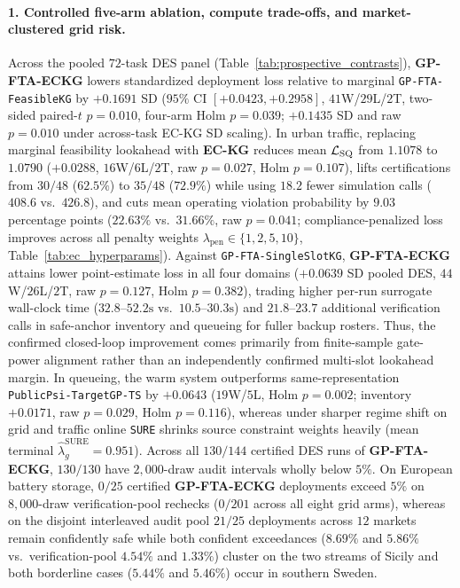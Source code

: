 \paragraph{1. Controlled five-arm ablation, compute trade-offs, and market-clustered grid risk.}
Across the pooled $72$-task DES panel (Table~\ref{tab:prospective_contrasts}), \textbf{GP-FTA-ECKG} lowers standardized deployment loss relative to marginal \texttt{GP-FTA-FeasibleKG} by $+0.1691$ SD ($95\%$ CI $[+0.0423, +0.2958]$, $41$W/$29$L/$2$T, two-sided paired-$t$ $p = 0.010$, four-arm Holm $p = 0.039$; $+0.1435$ SD and raw $p = 0.010$ under across-task EC-KG SD scaling). In urban traffic, replacing marginal feasibility lookahead with \textbf{EC-KG} reduces mean $\mathcal{L}_{\mathrm{SQ}}$ from $1.1078$ to $1.0790$ ($+0.0288$, $16$W/$6$L/$2$T, raw $p = 0.027$, Holm $p = 0.107$), lifts certifications from $30/48$ ($62.5\%$) to $35/48$ ($72.9\%$) while using $18.2$ fewer simulation calls ($408.6$ vs.\ $426.8$), and cuts mean operating violation probability by $9.03$ percentage points ($22.63\%$ vs.\ $31.66\%$, raw $p = 0.041$; compliance-penalized loss improves across all penalty weights $\lambda_{\mathrm{pen}}\in\{1,2,5,10\}$, Table~\ref*{tab:ec_hyperparams}). Against \texttt{GP-FTA-SingleSlotKG}, \textbf{GP-FTA-ECKG} attains lower point-estimate loss in all four domains ($+0.0639$ SD pooled DES, $44$W/$26$L/$2$T, raw $p=0.127$, Holm $p=0.382$), trading higher per-run surrogate wall-clock time ($32.8$--$52.2\text{s}$ vs.\ $10.5$--$30.3\text{s}$) and $21.8$--$23.7$ additional verification calls in safe-anchor inventory and queueing for fuller backup rosters. Thus, the confirmed closed-loop improvement comes primarily from finite-sample gate-power alignment rather than an independently confirmed multi-slot lookahead margin. In queueing, the warm system outperforms same-representation \texttt{PublicPsi-TargetGP-TS} by $+0.0643$ ($19$W/$5$L, Holm $p=0.002$; inventory $+0.0171$, raw $p=0.029$, Holm $p=0.116$), whereas under sharper regime shift on grid and traffic online \texttt{SURE} shrinks source constraint weights heavily (mean terminal $\hat{\lambda}_g^{\mathrm{SURE}} = 0.951$). Across all $130/144$ certified DES runs of \textbf{GP-FTA-ECKG}, $130/130$ have $2{,}000$-draw audit intervals wholly below $5\%$. On European battery storage, $0/25$ certified \textbf{GP-FTA-ECKG} deployments exceed $5\%$ on $8{,}000$-draw verification-pool rechecks ($0/201$ across all eight grid arms), whereas on the disjoint interleaved audit pool $21/25$ deployments across $12$ markets remain confidently safe while both confident exceedances ($8.69\%$ and $5.86\%$ vs.\ verification-pool $4.54\%$ and $1.33\%$) cluster on the two streams of Sicily and both borderline cases ($5.44\%$ and $5.46\%$) occur in southern Sweden.

